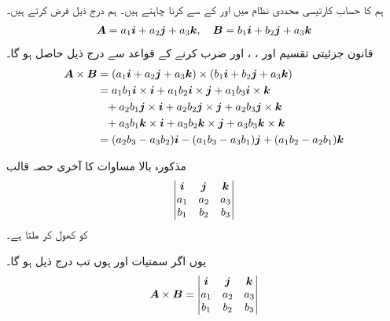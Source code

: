 ہم  کا حساب  کارتیسی محددی نظام میں  اور  کے   سے کرنا چاہتے ہیں۔ ہم درج ذیل فرض کرتے ہیں۔
\begin{align*}
\kvec{A}=a_1\ai+a_2\aj+a_3\ak,\quad \kvec{B}=b_1\ai+b_2\aj+a_3\ak
\end{align*}
قانون جزئیتی تقسیم اور ،  ، اور   ضرب کرنے کے قواعد  سے درج ذیل حاصل ہو گا۔
\begin{align*}
\kvec{A}\times\kvec{B}&=(a_1\ai+a_2\aj+a_3\ak)\times(b_1\ai+b_2\aj+a_3\ak)\\
&=a_1b_1\ai\times\ai+a_1b_2\ai\times\aj+a_1b_3\ai\times\ak\\
&\phantom{=}+a_2b_1\aj\times\ai+a_2b_2\aj\times\aj+a_2b_3\aj\times\ak\\
&\phantom{=}+a_3b_1\ak\times\ai+a_3b_2\ak\times\aj+a_3b_3\ak\times\ak\\
&=(a_2b_3-a_3b_2)\ai-(a_1b_3-a_3b_1)\aj+(a_1b_2-a_2b_1)\ak
\end{align*}  

مذکورہ بالا مساوات کا آخری حصہ قالب
\begin{align*}
\begin{vmatrix}
\ai&\aj&\ak\\
a_1&a_2&a_3\\
b_1&b_2&b_3
\end{vmatrix}
\end{align*}  
 کو کھول کر ملتا ہے۔

یوں اگر سمتیات  اور  ہوں تب درج ذیل ہو گا۔
\begin{align}
\kvec{A}\times\kvec{B}=
\begin{vmatrix}
\ai&\aj&\ak\\
a_1&a_2&a_3\\
b_1&b_2&b_3
\end{vmatrix}
\end{align}

